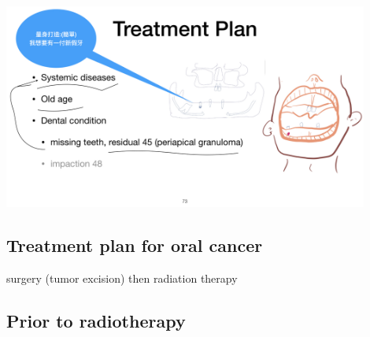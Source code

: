 \documentclass[
paper=landscape,
paper=160mm:90mm, %
fontsize=11pt, %
pagesize, %
parskip=half-, %
]{scrartcl} %
\theoremstyle{mythmstyle} %
\begin{document}


\begin{center} %
    \centering
    \includegraphics[width=12cm]{ContemporaryOMS_case祁爺爺.jpeg.005.jpeg}
\end{center}



\subsection{Treatment plan for oral cancer}

surgery (tumor excision)
then radiation therapy

\subsection{Prior to radiotherapy}
\end{document}
